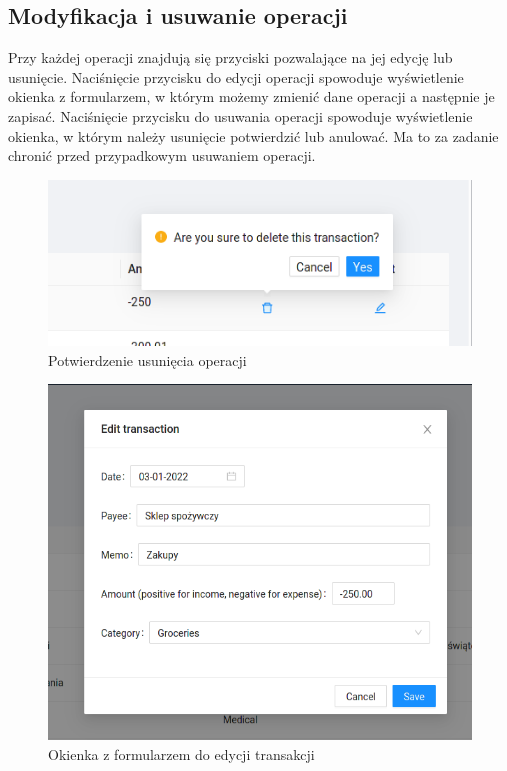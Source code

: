\documentclass[shortabstract,inz]{iithesis}
\begin{document}
\subsection{Modyfikacja i usuwanie operacji}
Przy każdej operacji znajdują się przyciski pozwalające na jej edycję lub usunięcie. Naciśnięcie przycisku do edycji operacji spowoduje wyświetlenie okienka z formularzem, w którym możemy zmienić dane operacji a następnie je zapisać. Naciśnięcie przycisku do usuwania operacji spowoduje wyświetlenie okienka, w którym należy usunięcie potwierdzić lub anulować. Ma to za zadanie chronić przed przypadkowym usuwaniem operacji.
\begin{figure}
	\centering
	\includegraphics[scale=0.7]{screen-delete-transaction.png}
	\caption{Potwierdzenie usunięcia operacji}
	\label{fig:screen-delete-transaction}
\end{figure}
\begin{figure}
	\centering
	\includegraphics[scale=0.7]{screen-edit-transaction.png}
	\caption{Okienka z formularzem do edycji transakcji}
	\label{fig:screen-edit-transaction}
\end{figure}
\end{document}
